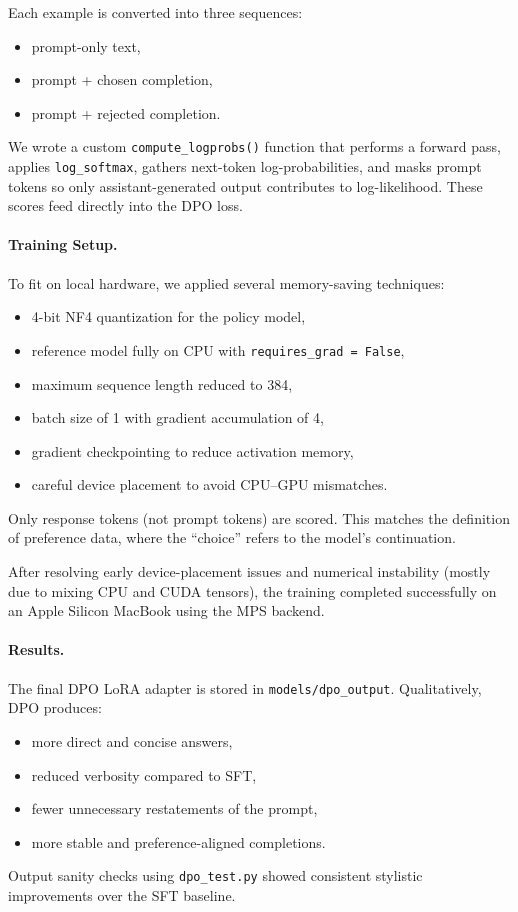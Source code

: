 \documentclass[11pt,a4paper]{article}
\begin{document}
Each example is converted into three sequences:
\begin{itemize}
    \item prompt-only text,
    \item prompt + chosen completion,
    \item prompt + rejected completion.
\end{itemize}

We wrote a custom \texttt{compute\_logprobs()} function that performs a forward pass, applies \texttt{log\_softmax}, gathers next-token log-probabilities, and masks prompt tokens so only assistant-generated output contributes to log-likelihood. These scores feed directly into the DPO loss.

\paragraph{Training Setup.}
To fit on local hardware, we applied several memory-saving techniques:
\begin{itemize}
    \item 4-bit NF4 quantization for the policy model,
    \item reference model fully on CPU with \texttt{requires\_grad = False},
    \item maximum sequence length reduced to 384,
    \item batch size of 1 with gradient accumulation of 4,
    \item gradient checkpointing to reduce activation memory,
    \item careful device placement to avoid CPU--GPU mismatches.
\end{itemize}

Only response tokens (not prompt tokens) are scored. This matches the definition of preference data, where the ``choice'' refers to the model's continuation.

After resolving early device-placement issues and numerical instability (mostly due to mixing CPU and CUDA tensors), the training completed successfully on an Apple Silicon MacBook using the MPS backend.

\paragraph{Results.}
The final DPO LoRA adapter is stored in \texttt{models/dpo\_output}. Qualitatively, DPO produces:
\begin{itemize}
    \item more direct and concise answers,
    \item reduced verbosity compared to SFT,
    \item fewer unnecessary restatements of the prompt,
    \item more stable and preference-aligned completions.
\end{itemize}
Output sanity checks using \texttt{dpo\_test.py} showed consistent stylistic improvements over the SFT baseline.
\end{document}
